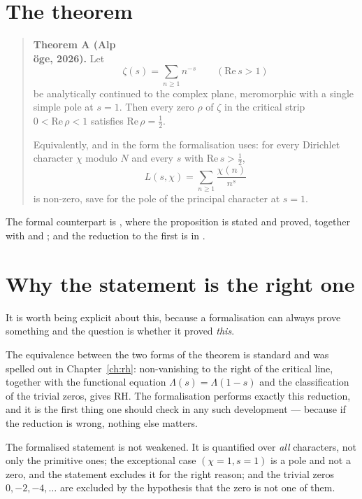 \section{The theorem}\begin{quote}
\textbf{Theorem A (Alp\\\"oge, 2026).} Let
\[
\zeta(s) = \sum_{n \ge 1} n^{-s}\qquad (\mathrm{Re}\,  s > 1)
\]
be analytically continued to the complex plane, meromorphic with a single
simple pole at $s = 1$. Then every zero $\rho$ of $\zeta$ in the critical
strip $0 < \mathrm{Re}\, \rho < 1$ satisfies $\mathrm{Re}\, \rho = \tfrac12$.

Equivalently, and in the form the formalisation uses: for every
Dirichlet character $\chi$ modulo $N$ and every $s$ with $\mathrm{Re}\,  s > \tfrac12$,
\[
L(s,\chi) = \sum_{n \ge 1}\frac{\chi(n)}{n^s}
\]
is non-zero, save for the pole of the principal character at $s = 1$.
\end{quote}

The formal counterpart is
,
where the proposition
 is stated and proved, together with
 and
; and the reduction to the first is
 in
.

\section{Why the statement is the right one}It is worth being explicit about this, because a formalisation can always
prove something and the question is whether it proved \emph{this}.

The equivalence between the two forms of the theorem is standard and was
spelled out in Chapter~\ref{ch:rh}: non-vanishing to the right of the
critical line, together with the functional equation $\Lambda(s) =
\Lambda(1-s)$ and the classification of the trivial zeros, gives RH. The
formalisation performs exactly this reduction, and it is the first thing one
should check in any such development --- because if the reduction is wrong,
nothing else matters.

The formalised statement is not weakened. It is quantified over \emph{all}
characters, not only the primitive ones; the exceptional case
$(\chi = 1, s = 1)$ is a pole and not a zero, and the statement excludes it
for the right reason; and the trivial zeros $0, -2, -4, \dots$ are excluded
by the hypothesis that the zero is not one of them.

